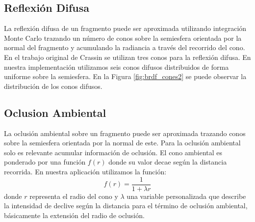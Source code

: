 \subsection{Reflexión Difusa}
La reflexión difusa de un fragmento puede ser aproximada utilizando integración Monte Carlo trazando un número de conos sobre la semiesfera orientada por la normal del fragmento y acumulando la radiancia a través del recorrido del cono. En el trabajo original de Crassin se utilizan tres conos para la reflexión difusa. En nuestra implementación utilizamos seis conos difusos distribuidos de forma uniforme sobre la semiesfera. En la Figura \ref{fig:brdf_cones2} se puede observar la distribución de los conos difusos.
\subsection{Oclusion Ambiental}
\label{sub:occl_ambt_prop}
La oclusión ambiental sobre un fragmento puede ser aproximada trazando conos sobre la semiesfera orientada por la normal de este. Para la oclusión ambiental solo es relevante acumular información de oclusión. El cono ambiental es ponderado por una función $f(r)$ donde su valor decae según la distancia recorrida. En nuestra aplicación utilizamos la función:
\begin{equation}
	f(r) = \frac{1}{1+\lambda r}
\end{equation} donde $r$ representa el radio del cono y $\lambda$ una variable personalizada que describe la intensidad de declive según la distancia para el término de oclusión ambiental, básicamente la extensión del radio de oclusión.
